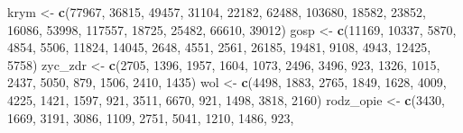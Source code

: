 \documentclass[polish,]{book}
\newenvironment{Shaded}{\begin{snugshade}}{\end{snugshade}}
\newcommand{\DecValTok}[1]{\textcolor[rgb]{0.00,0.00,0.81}{#1}}
\newcommand{\KeywordTok}[1]{\textcolor[rgb]{0.13,0.29,0.53}{\textbf{#1}}}
\newcommand{\NormalTok}[1]{#1}
\newcommand{\StringTok}[1]{\textcolor[rgb]{0.31,0.60,0.02}{#1}}
\begin{document}
\begin{Shaded}
\begin{Highlighting}[]
\NormalTok{krym <-}\StringTok{ }\KeywordTok{c}\NormalTok{(}\DecValTok{77967}\NormalTok{, }\DecValTok{36815}\NormalTok{, }\DecValTok{49457}\NormalTok{, }\DecValTok{31104}\NormalTok{, }\DecValTok{22182}\NormalTok{, }\DecValTok{62488}\NormalTok{, }\DecValTok{103680}\NormalTok{, }\DecValTok{18582}\NormalTok{, }\DecValTok{23852}\NormalTok{, }\DecValTok{16086}\NormalTok{,}
          \DecValTok{53998}\NormalTok{, }\DecValTok{117557}\NormalTok{, }\DecValTok{18725}\NormalTok{, }\DecValTok{25482}\NormalTok{, }\DecValTok{66610}\NormalTok{, }\DecValTok{39012}\NormalTok{)}
\NormalTok{gosp <-}\StringTok{ }\KeywordTok{c}\NormalTok{(}\DecValTok{11169}\NormalTok{, }\DecValTok{10337}\NormalTok{, }\DecValTok{5870}\NormalTok{, }\DecValTok{4854}\NormalTok{, }\DecValTok{5506}\NormalTok{, }\DecValTok{11824}\NormalTok{, }\DecValTok{14045}\NormalTok{, }\DecValTok{2648}\NormalTok{, }\DecValTok{4551}\NormalTok{, }\DecValTok{2561}\NormalTok{,}
          \DecValTok{26185}\NormalTok{, }\DecValTok{19481}\NormalTok{, }\DecValTok{9108}\NormalTok{, }\DecValTok{4943}\NormalTok{, }\DecValTok{12425}\NormalTok{, }\DecValTok{5758}\NormalTok{)}
\NormalTok{zyc_zdr <-}\StringTok{ }\KeywordTok{c}\NormalTok{(}\DecValTok{2705}\NormalTok{, }\DecValTok{1396}\NormalTok{, }\DecValTok{1957}\NormalTok{, }\DecValTok{1604}\NormalTok{, }\DecValTok{1073}\NormalTok{, }\DecValTok{2496}\NormalTok{, }\DecValTok{3496}\NormalTok{, }\DecValTok{923}\NormalTok{, }\DecValTok{1326}\NormalTok{, }\DecValTok{1015}\NormalTok{, }\DecValTok{2437}\NormalTok{,}
             \DecValTok{5050}\NormalTok{, }\DecValTok{879}\NormalTok{, }\DecValTok{1506}\NormalTok{, }\DecValTok{2410}\NormalTok{, }\DecValTok{1435}\NormalTok{)}
\NormalTok{wol <-}\StringTok{ }\KeywordTok{c}\NormalTok{(}\DecValTok{4498}\NormalTok{, }\DecValTok{1883}\NormalTok{, }\DecValTok{2765}\NormalTok{, }\DecValTok{1849}\NormalTok{, }\DecValTok{1628}\NormalTok{, }\DecValTok{4009}\NormalTok{, }\DecValTok{4225}\NormalTok{, }\DecValTok{1421}\NormalTok{, }\DecValTok{1597}\NormalTok{, }\DecValTok{921}\NormalTok{, }\DecValTok{3511}\NormalTok{,}
         \DecValTok{6670}\NormalTok{, }\DecValTok{921}\NormalTok{, }\DecValTok{1498}\NormalTok{, }\DecValTok{3818}\NormalTok{, }\DecValTok{2160}\NormalTok{)}
\NormalTok{rodz_opie <-}\StringTok{ }\KeywordTok{c}\NormalTok{(}\DecValTok{3430}\NormalTok{, }\DecValTok{1669}\NormalTok{, }\DecValTok{3191}\NormalTok{, }\DecValTok{3086}\NormalTok{, }\DecValTok{1109}\NormalTok{, }\DecValTok{2751}\NormalTok{, }\DecValTok{5041}\NormalTok{, }\DecValTok{1210}\NormalTok{, }\DecValTok{1486}\NormalTok{, }\DecValTok{923}\NormalTok{,}

\end{Highlighting}
\end{Shaded}
\end{document}
